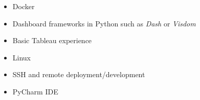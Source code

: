 
\begin{itemize}
\item Docker

\end{itemize}

\begin{itemize}
\item Dashboard frameworks in Python such as \textit{Dash} or \textit{Visdom}
\item Basic Tableau experience

\end{itemize}

\begin{itemize}
\item Linux {\faLinux}
\item SSH and remote deployment/development
\item PyCharm IDE
\end{itemize}

%
%






